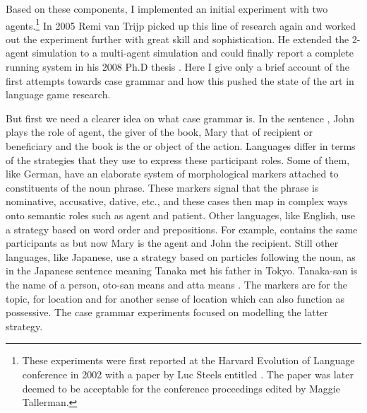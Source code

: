 Based on these components, I implemented an initial experiment with two agents.\footnote{These experiments were first reported at the Harvard Evolution of Language conference in 2002 with a paper by Luc Steels
entitled . The paper was later deemed 
 to be acceptable for the conference 
proceedings edited by Maggie Tallerman.}
In 2005 Remi van Trijp picked up this line of research again and worked out the experiment 
further with great skill and sophistication. He extended the 
2-agent simulation to a multi-agent simulation and could finally report a complete running system in his 2008 Ph.D 
thesis \citep{VanTrijp:2014}. Here I give only a brief account of the first attempts towards case grammar
and how this pushed the state of the art in language game research. 

But first we need a clearer idea on what case grammar is.
In the sentence , John plays the role of agent, the giver 
of the book, Mary that of recipient or 
beneficiary and the book is the  or object of the action. Languages differ in terms of the strategies that they 
use to express these participant roles. Some of them, like German, have an elaborate system of morphological 
markers attached to constituents of the noun phrase. These markers signal that the 
phrase is nominative, accusative, dative, etc., and these cases then map in complex ways 
onto semantic roles such as agent and patient.
Other languages, like English, use a strategy based on word order and prepositions. For example, 
 contains the same participants as  but now Mary is the 
agent and John the recipient. Still other languages, like Japanese, use a strategy based on particles following 
the noun, as in the Japanese sentence  
meaning Tanaka met his father in Tokyo. Tanaka-san is the name of a person, oto-san means  and atta 
means . The markers are  for the topic,  for location and  for another sense of location which can 
also function as possessive. The case grammar experiments focused on modelling the latter strategy. 


